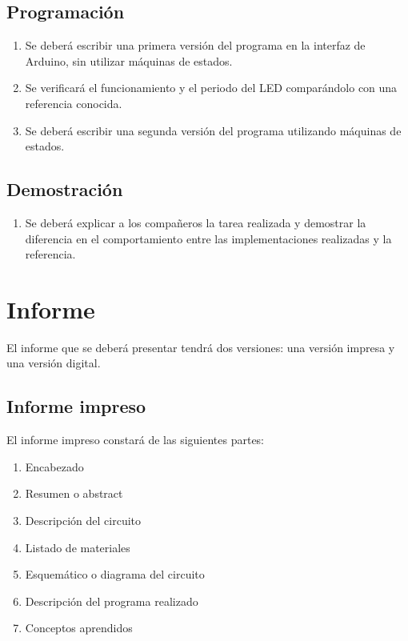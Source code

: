 \documentclass[12pt,letterpaper]{IEEEtran}
\begin{document}
\subsection{Programación}

\begin{enumerate}[resume]
	\item Se deberá escribir una primera versión del programa en la interfaz de Arduino, sin utilizar máquinas de estados.
	\item Se verificará el funcionamiento y el periodo del LED comparándolo con una referencia conocida.
	\item Se deberá escribir una segunda versión del programa utilizando máquinas de estados.
\end{enumerate}


\subsection{Demostración}

\begin{enumerate}[resume]
	\item Se deberá explicar a los compañeros la tarea realizada y demostrar la diferencia en el comportamiento entre las implementaciones realizadas y la referencia.
\end{enumerate}

\section{Informe}

El informe que se deberá presentar tendrá dos versiones: una versión impresa y una versión digital.

\subsection{Informe impreso}

El informe impreso constará de las siguientes partes:

\begin{enumerate}
  \item Encabezado
  \item Resumen o abstract
  \item Descripción del circuito
  \item Listado de materiales
  \item Esquemático o diagrama del circuito
  \item Descripción del programa realizado
  \item Conceptos aprendidos
\end{enumerate}
\end{document}
